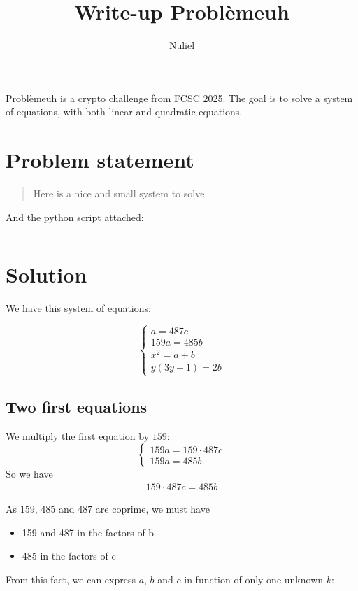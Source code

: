 \documentclass[]{article}
\title{Write-up Problèmeuh}
\author{Nuliel}
\date{}
\begin{document}
\maketitle
Problèmeuh is a crypto challenge from FCSC 2025. The goal is to solve a system of equations, with both linear and quadratic equations.

\section{Problem statement}

\begin{quote}
    Here is a nice and small system to solve.
\end{quote}

And the python script attached:

\inputminted{python}{problemeuh.py}

\section{Solution}

We have this system of equations:

\begin{equation*}
    \begin{cases}
        a = 487 c \\
        159 a = 485 b \\
        x^2 = a + b \\
        y (3 y - 1) = 2 b
    \end{cases}
\end{equation*}

\subsection{Two first equations}

We multiply the first equation by $159$:
\begin{equation*}
    \begin{cases}
        159 a = 159 \cdot 487 c \\
        159 a = 485 b
    \end{cases}
\end{equation*}
So we have 
\begin{align*}
    159 \cdot 487 c = 485 b
\end{align*}

As $159$, $485$ and $487$ are coprime, we must have
\begin{itemize}
    \item 159 and 487 in the factors of b
    \item 485 in the factors of c
\end{itemize}
From this fact, we can express $a$, $b$ and $c$ in function of only one unknown $k$:
\end{document}
